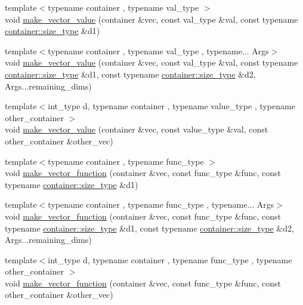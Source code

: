 \begin{DoxyCompactItemize}
\item 
{\footnotesize template$<$typename container , typename val\-\_\-type $>$ }\\void \hyperlink{namespaceIceBRG_a9176023dbe7fc7e68f8e0811a0de0c81}{make\-\_\-vector\-\_\-value} (container \&vec, const val\-\_\-type \&val, const typename \hyperlink{lib_2IceBRG__main_2common_8h_a566c61f2ca17211f4ba8557f3f65e8d3}{container\-::size\-\_\-type} \&d1)
\item 
{\footnotesize template$<$typename container , typename val\-\_\-type , typename... Args$>$ }\\void \hyperlink{namespaceIceBRG_a9e09c8639427a3259d4947879a3597fb}{make\-\_\-vector\-\_\-value} (container \&vec, const val\-\_\-type \&val, const typename \hyperlink{lib_2IceBRG__main_2common_8h_a566c61f2ca17211f4ba8557f3f65e8d3}{container\-::size\-\_\-type} \&d1, const typename \hyperlink{lib_2IceBRG__main_2common_8h_a566c61f2ca17211f4ba8557f3f65e8d3}{container\-::size\-\_\-type} \&d2, Args...\-remaining\-\_\-dims)
\item 
{\footnotesize template$<$int\-\_\-type d, typename container , typename value\-\_\-type , typename other\-\_\-container $>$ }\\void \hyperlink{namespaceIceBRG_aea1d0e75aa6b086d67d0dbd5625b53d6}{make\-\_\-vector\-\_\-value} (container \&vec, const value\-\_\-type \&val, const other\-\_\-container \&other\-\_\-vec)
\item 
{\footnotesize template$<$typename container , typename func\-\_\-type $>$ }\\void \hyperlink{namespaceIceBRG_a305cbfd9d239119500de04cffef48e2e}{make\-\_\-vector\-\_\-function} (container \&vec, const func\-\_\-type \&func, const typename \hyperlink{lib_2IceBRG__main_2common_8h_a566c61f2ca17211f4ba8557f3f65e8d3}{container\-::size\-\_\-type} \&d1)
\item 
{\footnotesize template$<$typename container , typename func\-\_\-type , typename... Args$>$ }\\void \hyperlink{namespaceIceBRG_a7da023ce0735e27d4d6482c833d0dec9}{make\-\_\-vector\-\_\-function} (container \&vec, const func\-\_\-type \&func, const typename \hyperlink{lib_2IceBRG__main_2common_8h_a566c61f2ca17211f4ba8557f3f65e8d3}{container\-::size\-\_\-type} \&d1, const typename \hyperlink{lib_2IceBRG__main_2common_8h_a566c61f2ca17211f4ba8557f3f65e8d3}{container\-::size\-\_\-type} \&d2, Args...\-remaining\-\_\-dims)
\item 
{\footnotesize template$<$int\-\_\-type d, typename container , typename func\-\_\-type , typename other\-\_\-container $>$ }\\void \hyperlink{namespaceIceBRG_af2c3d875d64225a57d4590e0f4356774}{make\-\_\-vector\-\_\-function} (container \&vec, const func\-\_\-type \&func, const other\-\_\-container \&other\-\_\-vec)

\end{DoxyCompactItemize}
